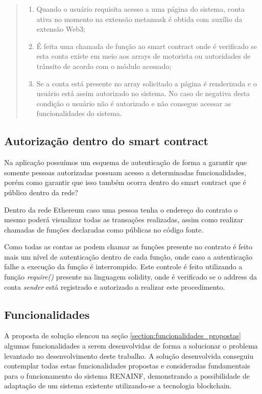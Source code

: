     \begin{quote}
        \begin{enumerate}
            \item Quando o usuário requisita acesso a uma página do sistema, conta ativa no momento na extensão metamask é obtida com auxílio da extensão Web3;
            \item É feita uma chamada de função ao smart contract onde é verificado se esta conta existe em meio aos arrays de motorista ou autoridades de trânsito de acordo com o módulo acessado;
            \item Se a conta está presente no array solicitado a página é renderizada e o usuário está assim autorizado no sistema. No caso de negativa desta condição o usuário não é autorizado e não consegue acessar as funcionalidades do sistema.
        \end{enumerate}
    \end{quote}

\subsection{Autorização dentro do smart contract}

Na aplicação possuímos um esquema de autenticação de forma a garantir que somente pessoas autorizadas possuam acesso a determinadas funcionalidades, porém como garantir que isso também ocorra dentro do smart contract que é público dentro da rede?

Dentro da rede Ethereum caso uma pessoa tenha o endereço do contrato o mesmo poderá visualizar todas as transações realizadas, assim como realizar chamadas de funções declaradas como públicas no código fonte.

Como todas as contas as podem chamar as funções presente no contrato é feito mais um nível de autenticação dentro de cada função, onde caso a autenticação falhe a execução da função é interrompido. Este controle é feito utilizando a função \textit{require()} presente na linguagem solidity, onde é verificado se o address da conta \textit{sender} está registrado e autorizado a realizar este procedimento.

\subsection{Funcionalidades}

A proposta de solução elencou na seção \ref{section:funcionalidades_propostas} algumas funcionalidades a serem desenvolvidas de forma a solucionar o problema levantado no desenvolvimento deste trabalho. A solução desenvolvida conseguiu contemplar todas estas funcionalidades propostas e consideradas fundamentais para o funcionamento do sistema RENAINF, demonstrando a possibilidade de adaptação de um sistema existente utilizando-se a tecnologia blockchain.

